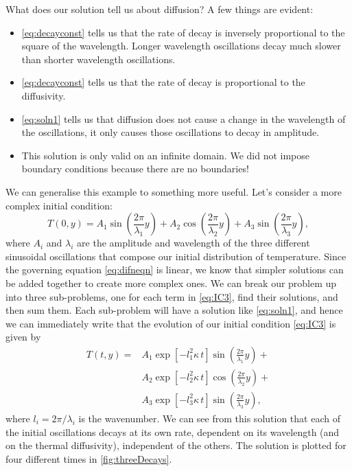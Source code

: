 \documentclass[11pt,twoside,a4paper]{article}
\begin{document}
What does our solution tell us about diffusion?  A few things are
evident:
\begin{itemize}
\item \autoref{eq:decayconst} tells us that the rate of decay is
  inversely proportional to the square of the wavelength.  Longer
  wavelength oscillations decay much slower than shorter wavelength
  oscillations.
\item \autoref{eq:decayconst} tells us that the rate of decay is
  proportional to the diffusivity.
\item \autoref{eq:soln1} tells us that diffusion does not cause a
  change in the wavelength of the oscillations, it only causes those
  oscillations to decay in amplitude.
\item This solution is only valid on an infinite domain.  We did not
  impose boundary conditions because there are no boundaries!
\end{itemize}

We can generalise this example to something more useful.  Let's
consider a more complex initial condition:
\begin{equation}
  \label{eq:IC3}
  T(0,y) = A_1\sin\left(\frac{2\pi}{\lambda_1}y\right) + 
  A_2\cos\left(\frac{2\pi}{\lambda_2}y\right) +
  A_3\sin\left(\frac{2\pi}{\lambda_3}y\right),
\end{equation}
where $A_i$ and $\lambda_i$ are the amplitude and wavelength of the
three different sinusoidal oscillations that compose our initial
distribution of temperature.  Since the governing equation
\eqref{eq:difneqn} is linear, we know that simpler solutions can be
added together to create more complex ones.  We can break our problem
up into three sub-problems, one for each term in \autoref{eq:IC3},
find their solutions, and then sum them.  Each sub-problem will have a
solution like \autoref{eq:soln1}, and hence we can immediately write
that the evolution of our initial condition \eqref{eq:IC3} is given by
\begin{align}
  \label{eq:soln3}
  T(t,y) = &A_1\exp\left[-l_1^2\kappa\,t\right] \sin\left(\frac{2\pi}{\lambda_1}y\right) + \nonumber\\
           &A_2\exp\left[-l_2^2\kappa\,t\right] \cos\left(\frac{2\pi}{\lambda_2}y\right) + \nonumber\\
           &A_3\exp\left[-l_3^2\kappa\,t\right]\sin\left(\frac{2\pi}{\lambda_3}y\right),
\end{align}
where $l_i = 2\pi/\lambda_i$ is the wavenumber.  We can see from this
solution that each of the initial oscillations decays at its own rate,
dependent on its wavelength (and on the thermal diffusivity),
independent of the others.  The solution is plotted for four different
times in \autoref{fig:threeDecays}.
\end{document}

